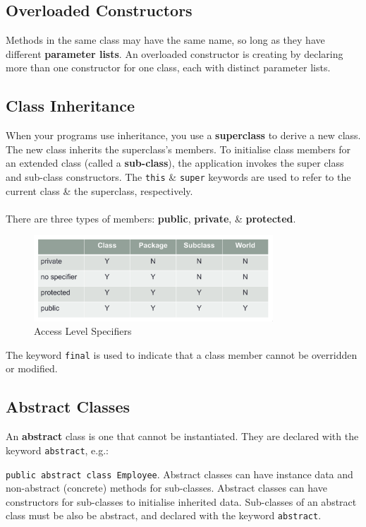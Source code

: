 \documentclass[a4paper,11pt]{article}
\begin{document}
\subsection{Overloaded Constructors}
Methods in the same class may have the same name, so long as they have different \textbf{parameter lists}.
An overloaded constructor is creating by declaring more than one constructor for one class, each with distinct parameter lists.

\subsection{Class Inheritance}
When your programs use inheritance, you use a \textbf{superclass} to derive a new class. 
The new class inherits the superclass's members.
To initialise class members for an extended class (called a \textbf{sub-class}), the application invokes the super class and 
sub-class constructors.
The \verb|this| \& \verb|super| keywords are used to refer to the current class \& the superclass, respectively.
\\\\
There are three types of members: \textbf{public}, \textbf{private}, \& \textbf{protected}.
\begin{figure}[H]
    \centering
    \includegraphics[width=0.8\textwidth]{./images/access_level_specifiers.png}
    \caption{Access Level Specifiers}
\end{figure}

The keyword \verb|final| is used to indicate that a class member cannot be overridden or modified.


\subsection{Abstract Classes}
An \textbf{abstract} class is one that cannot be instantiated. 
They are declared with the keyword \verb|abstract|, e.g.:

\texttt{public abstract class Employee}.
Abstract classes can have instance data and non-abstract (concrete) methods for sub-classes.
Abstract classes can have constructors for sub-classes to initialise inherited data.
Sub-classes of an abstract class must be also be abstract, and declared with the keyword \verb|abstract|.
\end{document}
